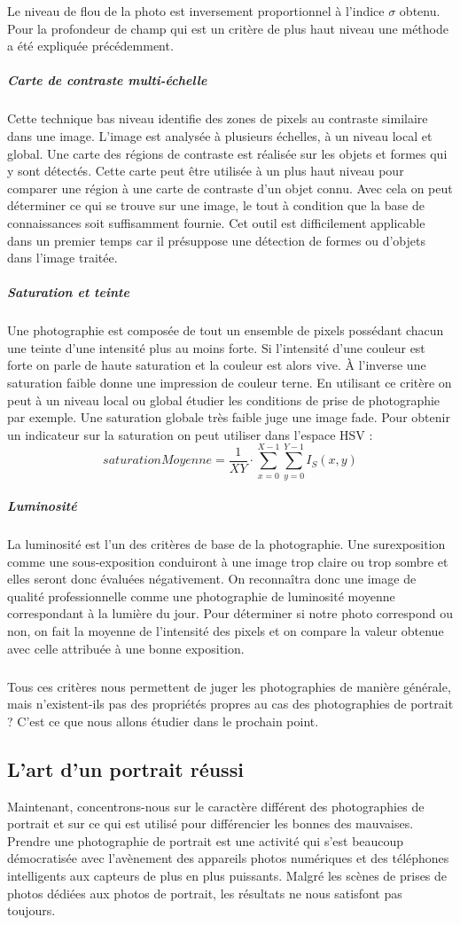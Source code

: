 \documentclass[11pt, french]{report-rd-info}
\begin{document}
Le niveau de flou de la photo est inversement proportionnel à l’indice $\sigma$ obtenu. Pour la profondeur de champ qui est un critère de plus haut niveau une méthode a été expliquée précédemment.

\subparagraph{Carte de contraste multi-échelle}
Cette technique bas niveau identifie des zones de pixels au contraste similaire dans une image. L’image est analysée à plusieurs échelles, à un niveau local et global. Une carte des régions de contraste est réalisée sur les objets et formes qui y sont détectés. Cette carte peut être utilisée à un plus haut niveau pour comparer une région à une carte de contraste d’un objet connu. Avec cela on peut déterminer ce qui se trouve sur une image, le tout à condition que la base de connaissances soit suffisamment fournie. Cet outil est difficilement applicable dans un premier temps car il présuppose une détection de formes ou d’objets dans l’image traitée.
\subparagraph{Saturation et teinte}
Une photographie est composée de tout un ensemble de pixels possédant chacun une teinte d’une intensité plus au moins forte. Si l’intensité d’une couleur est forte on parle de haute saturation et la couleur est alors vive. À l’inverse une saturation faible donne une impression de couleur terne. En utilisant ce critère on peut à un niveau local ou global étudier les conditions de prise de photographie par exemple. Une saturation globale très faible juge une image fade. Pour obtenir un indicateur sur la saturation on peut utiliser dans l'espace HSV : 
\begin{equation}
saturationMoyenne = \frac{1}{XY}\cdot \sum_{x=0}^{X-1} \sum_{y=0}^{Y-1} I_S(x,y)  
\end{equation}

\subparagraph{Luminosité}
La luminosité est l’un des critères de base de la photographie. Une surexposition  comme une sous-exposition conduiront à une image trop claire ou trop sombre et elles seront donc évaluées négativement. On reconnaîtra donc une image de qualité professionnelle comme une photographie de luminosité moyenne correspondant à la lumière du jour. Pour déterminer si notre photo correspond ou non, on fait la moyenne de l’intensité des pixels et on compare la valeur obtenue avec celle attribuée à une bonne exposition.
\subparagraph{}
Tous ces critères nous permettent de juger les photographies de manière générale, mais n'existent-ils pas des propriétés propres au cas des photographies de portrait ? C'est ce que nous allons étudier dans le prochain point.
\subsection{L’art d’un portrait réussi}
Maintenant, concentrons-nous sur le caractère différent des photographies de portrait et sur ce qui est utilisé pour différencier les bonnes des mauvaises.
Prendre une photographie de portrait est une activité qui s'est beaucoup démocratisée avec l'avènement des appareils photos numériques et des téléphones intelligents aux capteurs de plus en plus puissants. Malgré les scènes de prises de photos dédiées aux photos de portrait, les résultats ne nous satisfont pas toujours.
\end{document}
